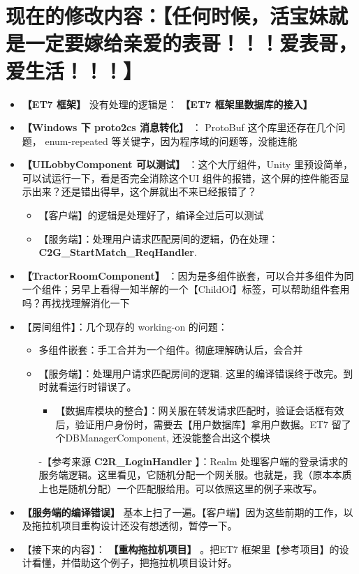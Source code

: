 \documentclass[9pt, b5paper]{article}
\begin{document}
\section{现在的修改内容：【任何时候，活宝妹就是一定要嫁给亲爱的表哥！！！爱表哥，爱生活！！！】}
\label{sec-2}
\begin{itemize}
\item \textbf{【ET7 框架】} 没有处理的逻辑是： \textbf{【ET7 框架里数据库的接入】}
\item \textbf{【Windows 下 proto2cs 消息转化】} ： ProtoBuf 这个库里还存在几个问题， enum-repeated 等关键字，因为程序域的问题等，没能连能
\item \textbf{【UILobbyComponent 可以测试】} ：这个大厅组件，Unity 里预设简单，可以试运行一下，看是否完全消除这个UI 组件的报错，这个屏的控件能否显示出来？还是错出得早，这个屏就出不来已经报错了？
\begin{itemize}
\item 【客户端】的逻辑是处理好了，编译全过后可以测试
\item 【服务端】：处理用户请求匹配房间的逻辑，仍在处理： \textbf{C2G\_StartMatch\_ReqHandler}.
\end{itemize}
\item \textbf{【TractorRoomComponent】} ：因为是多组件嵌套，可以合并多组件为同一个组件；另早上看得一知半解的一个【ChildOf】标签，可以帮助组件套用吗？再找找理解消化一下
\item 【房间组件】：几个现存的 working-on 的问题：
\begin{itemize}
\item 多组件嵌套：手工合并为一个组件。彻底理解确认后，会合并
\item 【服务端】：处理用户请求匹配房间的逻辑. 这里的编译错误终于改完。到时就看运行时错误了。
\begin{itemize}
\item 【数据库模块的整合】：网关服在转发请求匹配时，验证会话框有效后，验证用户身份时，需要去【用户数据库】拿用户数据。ET7 留了个DBManagerComponent, 还没能整合出这个模块
\end{itemize}
-【参考来源 \textbf{C2R\_LoginHandler} 】：Realm 处理客户端的登录请求的服务端逻辑。这里看见，它随机分配一个网关服。也就是，我（原本本质上也是随机分配）一个匹配服给用。可以依照这里的例子来改写。
\end{itemize}
\item \textbf{【服务端的编译错误】} 基本上扫了一遍。【客户端】因为这些前期的工作，以及拖拉机项目重构设计还没有想透彻，暂停一下。
\item 【接下来的内容】： \textbf{【重构拖拉机项目】} 。把ET7 框架里【参考项目】的设计看懂，并借助这个例子，把拖拉机项目设计好。

\end{itemize}
\end{document}
